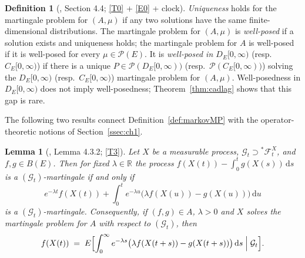 \documentclass[11pt,a4paper]{article}
\theoremstyle{plain}
\newtheorem{lemma}[theorem]{Lemma}
\theoremstyle{definition}
\newtheorem{definition}[theorem]{Definition}
\theoremstyle{remark}
\newcommand{\R}{\mathbb{R}}
\newcommand{\Bdd}{B}                           %
\newcommand{\Prob}{\mathcal{P}}                %
\newcommand{\DE}{D_E[0,\infty)}
\newcommand{\CE}{C_E[0,\infty)}
\newcommand{\Filt}{\mathcal{F}}
\newcommand{\Gilt}{\mathcal{G}}
\newcommand{\dif}{\,\mathrm{d}}
\newcommand{\EK}{\cite{EK86}}
\begin{document}
\begin{definition}[\EK, Section 4.4; \eqref{T0} + \eqref{E0} + clock]
  \label{def:wellposed}
  \emph{Uniqueness} holds for the martingale problem for $(A,\mu)$ if any two
  solutions have the same finite-dimensional distributions.  The martingale
  problem for $(A,\mu)$ is \emph{well-posed} if a solution exists and uniqueness
  holds; the martingale problem for $A$ is well-posed if it is well-posed for
  every $\mu \in \Prob(E)$.  It is \emph{well-posed in $\DE$} (resp.\ $\CE$) if
  there is a unique $P \in \Prob(\DE)$ (resp.\ $\Prob(\CE)$) solving the $\DE$
  (resp.\ $\CE$) martingale problem for $(A,\mu)$.  Well-posedness in $\DE$ does
  not imply well-posedness; Theorem~\ref{thm:cadlag} shows that this gap is rare.
\end{definition}

The following two results connect Definition~\ref{def:markovMP} with the
operator-theoretic notions of Section~\ref{ssec:ch1}.

\begin{lemma}[\EK, Lemma 4.3.2; \eqref{T3}]
  \label{lem:resolvent}
  Let $X$ be a measurable process, $\Gilt_t \supset {}^{*}\Filt^X_t$, and
  $f,g \in \Bdd(E)$.  Then for fixed $\lambda \in \R$ the process
  $f(X(t)) - \int_0^t g(X(s)) \dif s$ is a $(\Gilt_t)$-martingale if and only if
  \begin{equation}
    \label{eq:resolventmg}
    e^{-\lambda t} f(X(t))
      + \int_0^t e^{-\lambda u} \bigl( \lambda f(X(u)) - g(X(u)) \bigr) \dif u
  \end{equation}
  is a $(\Gilt_t)$-martingale.  Consequently, if $(f,g) \in A$, $\lambda > 0$ and
  $X$ solves the martingale problem for $A$ with respect to $(\Gilt_t)$, then
  \begin{equation}
    \label{eq:resolventrep}
    f(X(t)) \;=\; E\Bigl[ \int_0^\infty e^{-\lambda s}
      \bigl( \lambda f(X(t+s)) - g(X(t+s)) \bigr) \dif s \Bigm| \Gilt_t \Bigr] .
  \end{equation}
\end{lemma}
\end{document}

